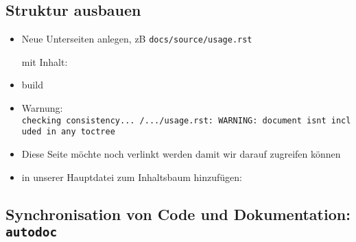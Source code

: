 \hypertarget{struktur-ausbauen}{%
\subsection{\texorpdfstring{\textbf{Struktur
ausbauen}}{Struktur ausbauen}}\label{struktur-ausbauen}}

\begin{itemize}
\item
  Neue Unterseiten anlegen, zB \texttt{docs/source/usage.rst}

  mit Inhalt:

\begin{Shaded}
\begin{Highlighting}[]
\NormalTok{===========}



\end{Highlighting}
\end{Shaded}
\item
  build
\item
  Warnung:
  \texttt{checking\ consistency...\ /.../usage.rst:\ WARNING:\ document\ isn\textquotesingle{}t\ included\ in\ any\ toctree}
\item
  Diese Seite möchte noch verlinkt werden damit wir darauf zugreifen
  können
\item
  in unserer Hauptdatei zum Inhaltsbaum hinzufügen:

\begin{Shaded}
\begin{Highlighting}[]

\end{Highlighting}
\end{Shaded}
\end{itemize}

\hypertarget{synchronisation-von-code-und-dokumentation-autodoc}{%
\subsection{\texorpdfstring{\textbf{Synchronisation von Code und
Dokumentation:
\texttt{autodoc}}}{Synchronisation von Code und Dokumentation: autodoc}}\label{synchronisation-von-code-und-dokumentation-autodoc}}

